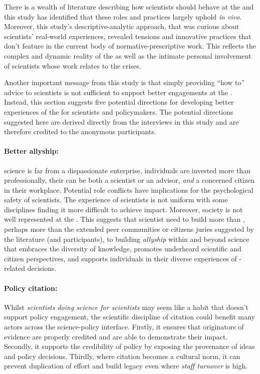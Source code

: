 There is a wealth of literature describing how scientists should behave at the \SPI{} and this study has identified that these roles and practices largely uphold \emph{in vivo}. Moreover, this study's descriptive-analytic approach, that was curious about scientists' real-world experiences, revealed tensions and innovative practices that don't feature in the current body of normative-prescriptive work. This reflects the complex and dynamic reality of the \SPI{} as well as the intimate personal involvement of scientists whose work relates to the \CAN{} crises. 

Another important message from this study is that simply providing ``how to'' advice to scientists is not sufficient to support better engagements at the \SPI. Instead, this section suggests five potential directions for developing better experiences of the \SPI{} for scientists and policymakers. The potential directions suggested here are derived directly from the interviews in this study and are therefore credited to the anonymous participants.

\paragraph{Better allyship:}
\CAN{} science is far from a dispassionate enterprise, individuals are invested more than professionally, their \skirole{} can be both a scientist or an advisor, \emph{and} a concerned citizen in their workplace. Potential role conflicts have implications for the psychological safety of scientists. The experience of scientists is not uniform with some disciplines finding it more difficult to achieve impact. Moreover, society is not well represented at the \SPI{}. This suggests that scientist need to build more than \skinetw{}, perhaps more than the extended peer communities or citizens juries suggested by the literature (and participants), to building \emph{allyship} within and beyond science that embraces the diversity of knowledge, promotes underheard scientific and citizen perspectives, and supports individuals in their diverse experiences of \CAN-related decisions.

\paragraph{Policy citation:}
Whilst \emph{scientists doing science for scientists} may seem like a habit that doesn't support policy engagement, the scientific discipline of citation could benefit many actors across the science-policy interface. Firstly, it ensures that originators of evidence are properly credited and are able to demonstrate their impact. Secondly, it supports the credibility of policy by exposing the provenance of ideas and policy decisions. Thirdly, where citation becomes a cultural norm, it can prevent duplication of effort and build legacy even where \emph{staff turnover} is high.

